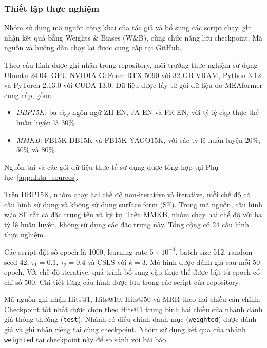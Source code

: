 


\subsubsection{Thiết lập thực nghiệm}

Nhóm sử dụng mã nguồn công khai của tác giả và bổ sung các script chạy, ghi nhận kết quả bằng Weights \& Biases (W\&B), cùng chức năng lưu checkpoint. Mã nguồn và hướng dẫn chạy lại được cung cấp tại \href{https://github.com/keiranoluv/Reproduce_CateEA}{GitHub}.

Theo cấu hình được ghi nhận trong repository, môi trường thực nghiệm sử dụng Ubuntu 24.04, GPU NVIDIA GeForce RTX 5090 với 32 GB VRAM, Python 3.12 và PyTorch 2.13.0 với CUDA 13.0. Dữ liệu được lấy từ gói dữ liệu do MEAformer cung cấp, gồm:
\begin{itemize}
    \item \textit{DBP15K:} ba cặp ngôn ngữ ZH-EN, JA-EN và FR-EN, với tỷ lệ cặp thực thể huấn luyện là 30\%.
    \item \textit{MMKB:} FB15K-DB15K và FB15K-YAGO15K, với các tỷ lệ huấn luyện 20\%, 50\% và 80\%.
\end{itemize}
Nguồn tải và các gói dữ liệu thực tế sử dụng được tổng hợp tại
Phụ lục~\ref{app:data_sources}.

\begin{samepage}
Trên DBP15K, nhóm chạy hai chế độ non-iterative và iterative, mỗi chế độ có cấu hình sử dụng và không sử dụng surface form (SF). Trong mã nguồn, cấu hình w/o SF tắt cả đặc trưng tên và ký tự. Trên MMKB, nhóm chạy hai chế độ với ba tỷ lệ huấn luyện, không sử dụng các đặc trưng này. Tổng cộng có 24 cấu hình thực nghiệm.
\par
\end{samepage}

Các script đặt số epoch là 1000, learning rate $5\times10^{-4}$, batch size 512, random seed 42, $\tau_1=0.1$, $\tau_2=0.4$ và CSLS với $k=3$. Mô hình được đánh giá sau mỗi 50 epoch. Với chế độ iterative, quá trình bổ sung cặp thực thể được bật từ epoch có chỉ số 500. Chi tiết từng cấu hình được lưu trong các script của repository.

Mã nguồn ghi nhận Hits@1, Hits@10, Hits@50 và MRR theo hai chiều căn chỉnh. Checkpoint tốt nhất được chọn theo Hits@1 trung bình hai chiều của nhánh đánh giá thông thường (\texttt{test}). Nhánh có điều chỉnh danh mục (\texttt{weighted}) được đánh giá và ghi nhận riêng tại cùng checkpoint. Nhóm sử dụng kết quả của nhánh \texttt{weighted} tại checkpoint này để so sánh với bài báo.


